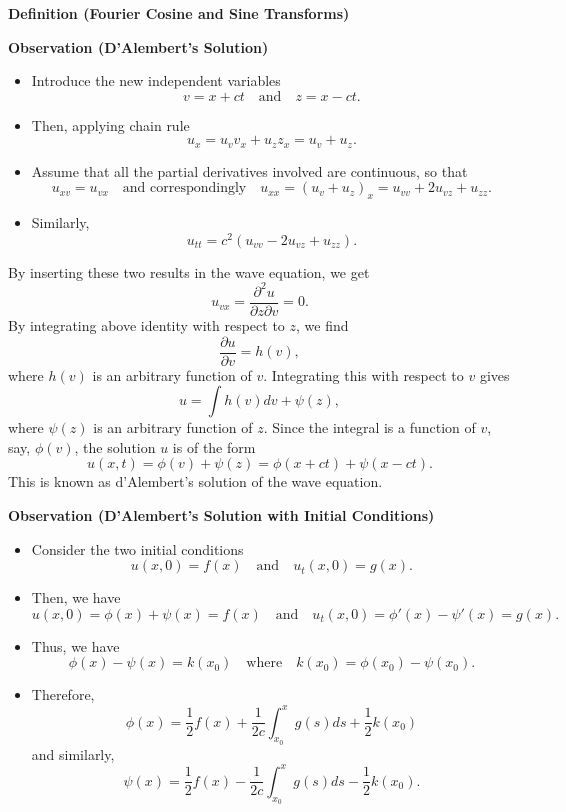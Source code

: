 \documentclass[12pt,openany]{book}
\theoremstyle{definition}
\begin{document}
	
	
	\textbf{Definition (Fourier Cosine and Sine Transforms)}
	
	
	
	
	
	\newpage
	
	\textbf{Observation (D'Alembert's Solution)}
	
	\begin{itemize}
		\item Introduce the new independent variables
		\[
		v = x + ct \quad \text{and} \quad z = x - ct.
		\]
		\item Then, applying chain rule
		\[
		u_x = u_v v_x + u_z z_x = u_v + u_z.
		\]
		\item Assume that all the partial derivatives involved are continuous, so that
		\[
		u_{xv} = u_{vx} \quad \text{and correspondingly} \quad u_{xx} = (u_v + u_z)_x = u_{vv} + 2u_{vz} + u_{zz}.
		\]
		\item Similarly,
		\[
		u_{tt} = c^2 (u_{vv} - 2u_{vz} + u_{zz}).
		\]
	\end{itemize}
	
	By inserting these two results in the wave equation, we get
	\[
	u_{vx} = \frac{\partial^2 u}{\partial z \partial v} = 0.
	\]
	By integrating above identity with respect to \( z \), we find
	\[
	\frac{\partial u}{\partial v} = h(v),
	\]
	where \( h(v) \) is an arbitrary function of \( v \). Integrating this with respect to \( v \) gives
	\[
	u = \int h(v) dv + \psi(z),
	\]
	where \( \psi(z) \) is an arbitrary function of \( z \). Since the integral is a function of \( v \), say, \( \phi(v) \), the solution \( u \) is of the form
	\[
	u(x, t) = \phi(v) + \psi(z) = \phi(x + ct) + \psi(x - ct).
	\]
	This is known as d'Alembert's solution of the wave equation.
	
	\textbf{Observation (D'Alembert's Solution with Initial Conditions)}
	
	\begin{itemize}
		\item Consider the two initial conditions
		\[
		u(x, 0) = f(x) \quad \text{and} \quad u_t(x, 0) = g(x).
		\]
		\item Then, we have
		\[
		u(x, 0) = \phi(x) + \psi(x) = f(x) \quad \text{and} \quad u_t(x, 0) = \phi'(x) - \psi'(x) = g(x).
		\]
		\item Thus, we have
		\[
		\phi(x) - \psi(x) = k(x_0) \quad \text{where} \quad k(x_0) = \phi(x_0) - \psi(x_0).
		\]
		\item Therefore,
		\[
		\phi(x) = \frac{1}{2} f(x) + \frac{1}{2c} \int_{x_0}^{x} g(s) ds + \frac{1}{2} k(x_0)
		\]
		and similarly,
		\[
		\psi(x) = \frac{1}{2} f(x) - \frac{1}{2c} \int_{x_0}^{x} g(s) ds - \frac{1}{2} k(x_0).
		\]
	\end{itemize}
	
\end{document}
